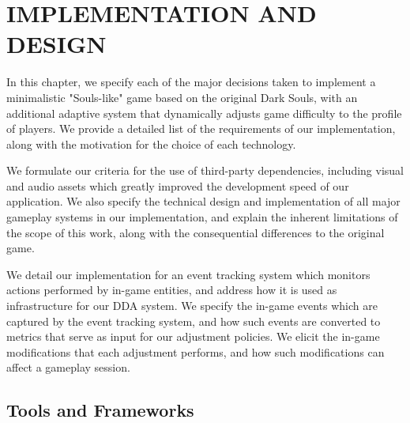 \chapter{IMPLEMENTATION AND DESIGN}
\label{ch:implementation-design}




In this chapter, we specify each of the major decisions taken to implement a minimalistic "Souls-like" game based on the original Dark Souls, with an additional adaptive system that dynamically adjusts game difficulty to the profile of players. We provide a detailed list of the requirements of our implementation, along with the motivation for the choice of each technology.

We formulate our criteria for the use of third-party dependencies, including visual and audio assets which greatly improved the development speed of our application. We also specify the technical design and implementation of all major gameplay systems in our implementation, and explain the inherent limitations of the scope of this work, along with the consequential differences to the original game. 

We detail our implementation for an event tracking system which monitors actions performed by in-game entities, and address how it is used as infrastructure for our DDA system. We specify the in-game events which are captured by the event tracking system, and how such events are converted to metrics that serve as input for our adjustment policies. We elicit the in-game modifications that each adjustment performs, and how such modifications can affect a gameplay session.


\section{Tools and Frameworks}


